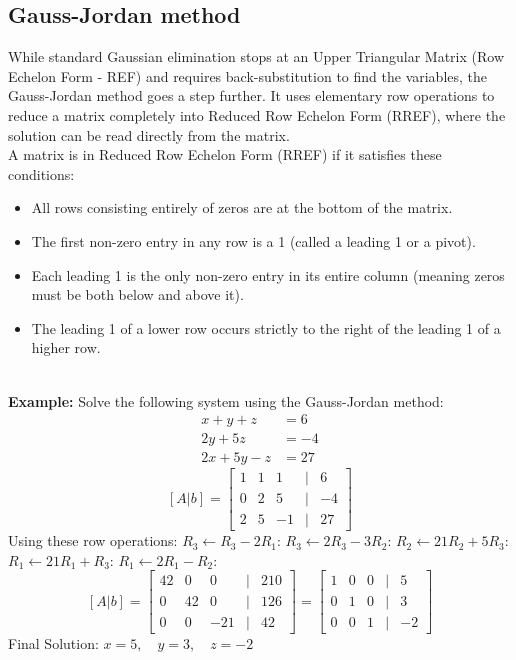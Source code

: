 \documentclass[DIV=20,oneside]{scrartcl}
\newcommand{\example}{
	\noindent\textbf{\\Example: }
}
\begin{document}
	\subsection{Gauss-Jordan method}
	While standard Gaussian elimination stops at an Upper Triangular Matrix (Row Echelon Form - REF) and requires back-substitution to find the variables, the Gauss-Jordan method goes a step further. It uses elementary row operations to reduce a matrix completely into Reduced Row Echelon Form (RREF), where the solution can be read directly from the matrix.
	\\A matrix is in Reduced Row Echelon Form (RREF) if it satisfies these conditions:
	\begin{itemize}[itemsep=0.5pt, topsep=1pt]
		\item All rows consisting entirely of zeros are at the bottom of the matrix.
		\item The first non-zero entry in any row is a 1 (called a leading 1 or a pivot).
		\item Each leading 1 is the only non-zero entry in its entire column (meaning zeros must be both below and above it).
		\item 	The leading 1 of a lower row occurs strictly to the right of the leading 1 of a higher row.
	\end{itemize}
	\example Solve the following system using the Gauss-Jordan method:$$\begin{aligned}
		x + y + z &= 6 \\
		2y + 5z &= -4 \\
		2x + 5y - z &= 27
	\end{aligned}$$
	$$[A | b]=\begin{bmatrix} 
		1 & 1 & 1 & | & 6 \\ 
		0 & 2 & 5 & | & -4 \\ 
		2 & 5 & -1 & | & 27 
	\end{bmatrix}$$
	Using these row operations: $R_3 \leftarrow R_3 - 2R_1$: $R_3 \leftarrow 2R_3-3R_2$: $R_2 \leftarrow 21R_2+5R_3$: $R_1 \leftarrow 21R_1+R_3$: $R_1 \leftarrow 2R_1-R_2:$
	$$[A|b]=\begin{bmatrix} 
		42 & 0 & 0 & | & 210 \\ 
		0 & 42 & 0 & | & 126 \\ 
		0 & 0 & -21 & | & 42 
	\end{bmatrix}=\begin{bmatrix} 
	1 & 0 & 0 & | & 5 \\ 
	0 & 1 & 0 & | & 3 \\ 
	0 & 0 & 1 & | & -2 
	\end{bmatrix}$$
	Final Solution: $x = 5, \quad y = 3, \quad z = -2$
\end{document}
